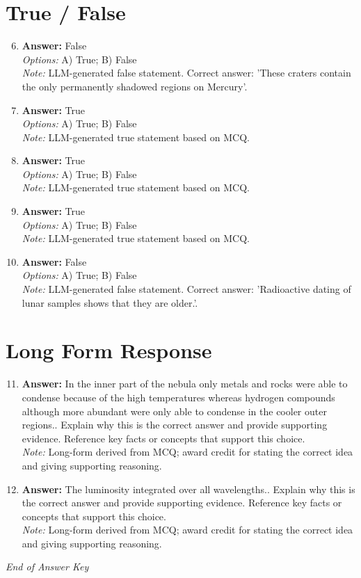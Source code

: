 \documentclass[12pt]{article}
\begin{document}
\section*{True / False}
\begin{enumerate}[label=\arabic*.]
\setcounter{enumi}{5}
\item \textbf{Answer:} False
\\ \textit{Options:} A) True; B) False
\\ \textit{Note:} LLM-generated false statement. Correct answer: 'These craters contain the only permanently shadowed regions on Mercury'.
\item \textbf{Answer:} True
\\ \textit{Options:} A) True; B) False
\\ \textit{Note:} LLM-generated true statement based on MCQ.
\item \textbf{Answer:} True
\\ \textit{Options:} A) True; B) False
\\ \textit{Note:} LLM-generated true statement based on MCQ.
\item \textbf{Answer:} True
\\ \textit{Options:} A) True; B) False
\\ \textit{Note:} LLM-generated true statement based on MCQ.
\item \textbf{Answer:} False
\\ \textit{Options:} A) True; B) False
\\ \textit{Note:} LLM-generated false statement. Correct answer: 'Radioactive dating of lunar samples shows that they are older.'.
\end{enumerate}

\section*{Long Form Response}
\begin{enumerate}[label=\arabic*.]
\setcounter{enumi}{10}
\item \textbf{Answer:} In the inner part of the nebula only metals and rocks were able to condense because of the high temperatures whereas hydrogen compounds although more abundant were only able to condense in the cooler outer regions.. Explain why this is the correct answer and provide supporting evidence. Reference key facts or concepts that support this choice.
\\ \textit{Note:} Long-form derived from MCQ; award credit for stating the correct idea and giving supporting reasoning.
\item \textbf{Answer:} The luminosity integrated over all wavelengths.. Explain why this is the correct answer and provide supporting evidence. Reference key facts or concepts that support this choice.
\\ \textit{Note:} Long-form derived from MCQ; award credit for stating the correct idea and giving supporting reasoning.
\end{enumerate}

\vfill
\noindent\textit{End of Answer Key}
\end{document}
